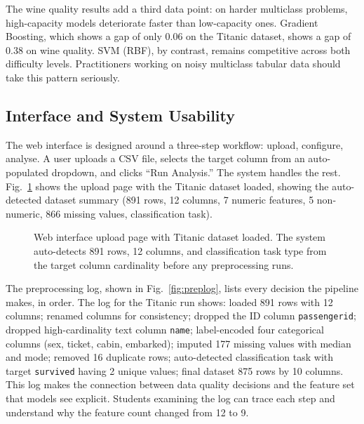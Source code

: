 \documentclass[conference]{IEEEtran}
\begin{document}
The wine quality results add a third data point: on harder multiclass problems, high-capacity models deteriorate faster than low-capacity ones. Gradient Boosting, which shows a gap of only 0.06 on the Titanic dataset, shows a gap of 0.38 on wine quality. SVM (RBF), by contrast, remains competitive across both difficulty levels. Practitioners working on noisy multiclass tabular data should take this pattern seriously.

\subsection{Interface and System Usability}

The web interface is designed around a three-step workflow: upload, configure, analyse. A user uploads a CSV file, selects the target column from an auto-populated dropdown, and clicks ``Run Analysis.'' The system handles the rest. Fig.~\ref{fig:interface} shows the upload page with the Titanic dataset loaded, showing the auto-detected dataset summary (891 rows, 12 columns, 7 numeric features, 5 non-numeric, 866 missing values, classification task).

\begin{figure}[t]
    \centering
    \caption{Web interface upload page with Titanic dataset loaded. The system auto-detects 891 rows, 12 columns, and classification task type from the target column cardinality before any preprocessing runs.}
    \label{fig:interface}
\end{figure}

The preprocessing log, shown in Fig.~\ref{fig:preplog}, lists every decision the pipeline makes, in order. The log for the Titanic run shows: loaded 891 rows with 12 columns; renamed columns for consistency; dropped the ID column \texttt{passengerid}; dropped high-cardinality text column \texttt{name}; label-encoded four categorical columns (sex, ticket, cabin, embarked); imputed 177 missing values with median and mode; removed 16 duplicate rows; auto-detected classification task with target \texttt{survived} having 2 unique values; final dataset 875 rows by 10 columns. This log makes the connection between data quality decisions and the feature set that models see explicit. Students examining the log can trace each step and understand why the feature count changed from 12 to 9.
\end{document}
